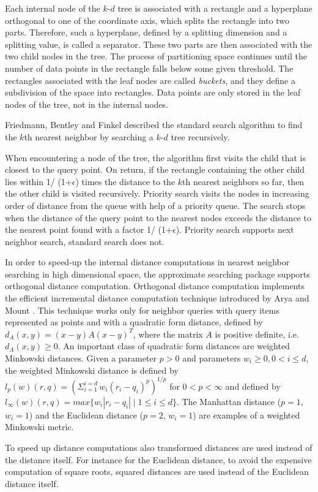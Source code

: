 Each internal node of the $k$-$d$ tree is associated with a rectangle
and a hyperplane orthogonal to one of the coordinate axis, which
splits the rectangle into two parts.  Therefore, such a hyperplane,
defined by a splitting dimension and a splitting value, is called a
separator.  These two parts are then associated with the two child
nodes in the tree. The process of partitioning space continues until
the number of data points in the rectangle falls below some given
threshold. The rectangles associated with the leaf nodes are called
{\it buckets}, and they define a subdivision of the space into
rectangles.  Data points are only stored in the leaf nodes of the
tree, not in the internal nodes.

Friedmann, Bentley and Finkel \cite{fbf-afbml-77} described the
standard search algorithm to find the $k$th nearest neighbor by
searching a $k$-$d$ tree recursively.

When encountering a node of the tree, the algorithm first visits the
child that is closest to the query point. On return, if the rectangle
containing the other child lies within 1/ (1+$\epsilon$) times the
distance to the $k$th nearest neighbors so far, then the other child
is visited recursively.  Priority search \cite{am-annqf-93} visits the
nodes in increasing order of distance from the queue with help of a
priority queue.  The search stops when the distance of the query point
to the nearest nodes exceeds the distance to the nearest point found
with a factor 1/ (1+$\epsilon$).  Priority search supports next
neighbor search, standard search does not.

In order to speed-up the internal distance computations in nearest
neighbor searching in high dimensional space, the approximate
searching package supports orthogonal distance computation. Orthogonal distance
computation
implements the efficient incremental distance computation technique
introduced by Arya and Mount \cite{am-afvq-93}.  This technique
works only for neighbor queries with query items represented as points
and with a quadratic form distance, defined by $d_A(x,y)=
(x-y)A(x-y)^T$, where the matrix $A$ is positive definite,
i.e. $d_A(x,y) \geq 0$.  An important class of quadratic form
distances are weighted Minkowski distances.  Given a parameter $p>0$
and parameters $w_i \geq 0, 0 < i \leq d$, the weighted Minkowski
distance is defined by $l_p(w)(r,q)= ({\Sigma_{i=1}^{i=d} \,
w_i(r_i-q_i)^p})^{1/p}$ for $0 < p <\infty$ and defined by
$l_{\infty}(w)(r,q)=max \{w_i |r_i-q_i| \mid 1 \leq i \leq d\}$.  The
Manhattan distance ($p=1$, $w_i=1$) and the Euclidean distance ($p=2$,
$w_i=1$) are examples of a weighted Minkowski metric.

To speed up distance computations also transformed distances are used
instead of the distance itself.  For instance for the Euclidean
distance, to avoid the expensive computation of square roots, squared
distances are used instead of the Euclidean distance itself.






